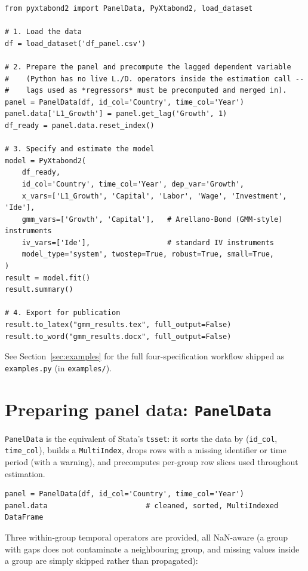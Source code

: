 \documentclass[11pt,a4paper]{article}
\begin{document}
\begin{lstlisting}[style=pystyle]
from pyxtabond2 import PanelData, PyXtabond2, load_dataset

# 1. Load the data
df = load_dataset('df_panel.csv')

# 2. Prepare the panel and precompute the lagged dependent variable
#    (Python has no live L./D. operators inside the estimation call --
#    lags used as *regressors* must be precomputed and merged in).
panel = PanelData(df, id_col='Country', time_col='Year')
panel.data['L1_Growth'] = panel.get_lag('Growth', 1)
df_ready = panel.data.reset_index()

# 3. Specify and estimate the model
model = PyXtabond2(
    df_ready,
    id_col='Country', time_col='Year', dep_var='Growth',
    x_vars=['L1_Growth', 'Capital', 'Labor', 'Wage', 'Investment', 'Ide'],
    gmm_vars=['Growth', 'Capital'],   # Arellano-Bond (GMM-style) instruments
    iv_vars=['Ide'],                  # standard IV instruments
    model_type='system', twostep=True, robust=True, small=True,
)
result = model.fit()
result.summary()

# 4. Export for publication
result.to_latex("gmm_results.tex", full_output=False)
result.to_word("gmm_results.docx", full_output=False)
\end{lstlisting}

See Section~\ref{sec:examples} for the full four-specification workflow
shipped as \texttt{examples.py} (in \texttt{examples/}).

\section{Preparing panel data: \texttt{PanelData}}
\label{sec:panels}

\texttt{PanelData} is the equivalent of Stata's \texttt{tsset}: it sorts the
data by (\texttt{id\_col}, \texttt{time\_col}), builds a \texttt{MultiIndex},
drops rows with a missing identifier or time period (with a warning), and
precomputes per-group row slices used throughout estimation.

\begin{lstlisting}[style=pystyle]
panel = PanelData(df, id_col='Country', time_col='Year')
panel.data                       # cleaned, sorted, MultiIndexed DataFrame
\end{lstlisting}

Three within-group temporal operators are provided, all NaN-aware (a group
with gaps does not contaminate a neighbouring group, and missing values
inside a group are simply skipped rather than propagated):
\end{document}
